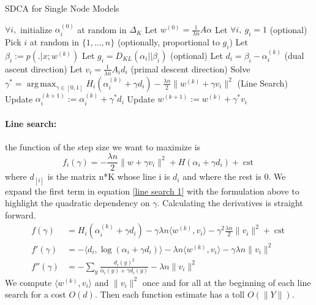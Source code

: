 \documentclass{article}
\DeclareMathOperator{\cst}{cst}
\DeclareMathOperator{\1}{\mathbb{1}}
\DeclareMathOperator*{\argmax}{arg\,max}
\begin{document}
\begin{algorithm}[ht]
    \caption{SDCA for Single Node Models}%
    \label{sdca for logreg}
\begin{algorithmic}
        \STATE $\forall i,$ initialize $\alpha_i^{(0)}$ at random in $\Delta_K$
        \STATE Let $w^{(0)} = \frac{1}{\lambda n} A \alpha$  
        \STATE Let $\forall i,\  g_i = 1$ (optional)
                \STATE Pick $i$ at random in $\{1,\ldots,n\}$ (optionally, proportional to $g_i$)
                \STATE Let $ \beta_i := p( . |x ; w^{(k)})$
                \STATE Let $g_i = D_{KL}(\alpha_i || \beta_i)$ (optional)
                \STATE Let $d_i = \beta_i - \alpha_i^{(k)}$ (dual ascent direction)
                \STATE Let $v_i = \frac{1}{\lambda n} A_i d_i $ (primal descent direction)
                \STATE Solve $\gamma^* = \argmax_{\gamma \in [0,1]} H_i(\alpha_i^{(k)} + \gamma d_i) - \frac{\lambda n}{2} \| w^{(k)} + \gamma v_i \|^2$ (Line Search)
               \STATE Update $\alpha_i^{(k+1)} := \alpha_i^{(k)} + \gamma^* d_i$
               \STATE Update $w^{(k+1)} := w^{(k)} + \gamma^* v_i $
        \ENDFOR
\end{algorithmic}
\end{algorithm}


\paragraph{Line search:} 
the function of the step size we want to maximize is 
\begin{equation}
	\label{line search 1}
	f_i(\gamma) = -\frac{\lambda n}{2} \|w + \gamma v_i\|^2 + H(\alpha_i + \gamma d_i) + \cst
\end{equation}
where $d_{[i]}$ is the matrix n*K whose line i is $d_i$ and where the rest is 0.
We expand the first term in equation \ref{line search 1} with the formulation above to highlight the quadratic dependency on $\gamma$.
Calculating the derivatives is straight forward.
\begin{align*}
	f(\gamma)
	& = H_i(\alpha_i^{(k)} + \gamma d_i)
	- \gamma \lambda n  \langle w^{(k)} , v_i \rangle 
	- \gamma^2 \frac{\lambda n}{2} \|v_i \|^2
	+ \cst
	\\
	f'(\gamma) & =  - \langle d_i, \log(\alpha_i + \gamma d_i) \rangle
	- \lambda n \langle w^{(k)} , v_i \rangle 
	- \gamma \lambda n \|v_i \|^2 
	\\
	f''(\gamma) & = - \sum_{y} \frac{d_{i}(y)^2 }{ \alpha_i(y) + \gamma d_i(y) }
	- \lambda n  \|v_i \|^2 
\end{align*}
We compute $\langle w^{(k)} , v_i \rangle$ and $ \|v_i \|^2$ once and for all at the beginning of each line search for a cost $O(d)$. Then each function estimate has a toll $O(\|Y\|)$.
\end{document}
